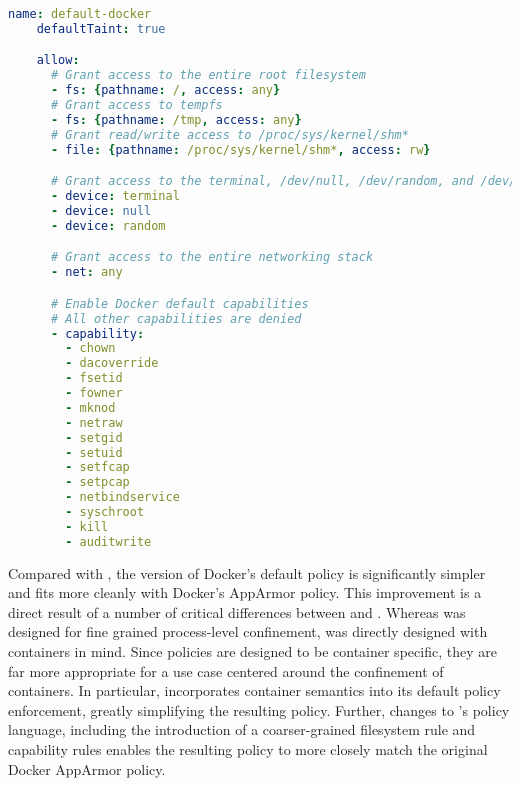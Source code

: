 \begin{lstlisting}[language=yaml, gobble=4,
  caption={[Implementing the default Docker policy in \bpfcontain{}]
    Implementing the default Docker policy in \bpfcontain{}.
    %A few coarse-grained
    %allow-rules can be used to capture permissive Docker defaults that are not covered
    %under \bpfcontain{}'s default policy. Other aspects of the Docker defaults are already
    %covered under \bpfcontain{} defaults, such as the inability to mount filesystems,
    %perform a number of privileged system calls, and interact with non-pid entries in
    %procfs and sysfs. Due to \bpfcontain{}'s default policy for file access and \gls{ipc},
    %it is neither necessary to specify file access rules for files within the container's
    %overlay filesystem nor \gls{ipc} rules for processes within the container.
  },
  label={lst:bpfcontain-docker-default}]
    name: default-docker
    defaultTaint: true

    allow:
      # Grant access to the entire root filesystem
      - fs: {pathname: /, access: any}
      # Grant access to tempfs
      - fs: {pathname: /tmp, access: any}
      # Grant read/write access to /proc/sys/kernel/shm*
      - file: {pathname: /proc/sys/kernel/shm*, access: rw}

      # Grant access to the terminal, /dev/null, /dev/random, and /dev/urandom
      - device: terminal
      - device: null
      - device: random

      # Grant access to the entire networking stack
      - net: any

      # Enable Docker default capabilities
      # All other capabilities are denied
      - capability:
        - chown
        - dacoverride
        - fsetid
        - fowner
        - mknod
        - netraw
        - setgid
        - setuid
        - setfcap
        - setpcap
        - netbindservice
        - syschroot
        - kill
        - auditwrite
\end{lstlisting}

Compared with \bpfbox{}, the \bpfcontain{} version of Docker's default policy is
significantly simpler and fits more cleanly with Docker's AppArmor policy. This
improvement is a direct result of a number of critical differences between \bpfbox{} and
\bpfcontain{}. Whereas \bpfbox{} was designed for fine grained process-level confinement,
\bpfcontain{} was directly designed with containers in mind. Since \bpfcontain{} policies
are designed to be container specific, they are far more appropriate for a use case
centered around the confinement of containers. In particular, \bpfcontain{} incorporates
container semantics into its default policy enforcement, greatly simplifying the resulting
policy.  Further, changes to \bpfcontain{}'s policy language, including the introduction
of a coarser-grained filesystem rule and capability rules enables the resulting policy to
more closely match the original Docker AppArmor policy.

